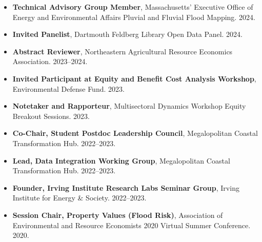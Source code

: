 \documentclass[10pt,oneside]{article}
\begin{document}
\begin{itemize}[label={}]
  \item \textbf{Technical Advisory Group Member}, Massachusetts’ Executive Office of Energy and Environmental Affairs Pluvial and Fluvial Flood Mapping. 2024.
  
  \item \textbf{Invited Panelist}, Dartmouth Feldberg Library Open Data Panel. 2024.
  
  \item \textbf{Abstract Reviewer}, Northeastern Agricultural Resource Economics Association. 2023--2024.
  
  \item \textbf{Invited Participant at Equity and Benefit Cost Analysis Workshop}, Environmental Defense Fund. 2023.
  
  \item \textbf{Notetaker and Rapporteur}, Multisectoral Dynamics Workshop Equity Breakout Sessions. 2023.
  
  \item \textbf{Co-Chair, Student Postdoc Leadership Council}, Megalopolitan Coastal Transformation Hub. 2022--2023.
  
  \item \textbf{Lead, Data Integration Working Group}, Megalopolitan Coastal Transformation Hub. 2022--2023.
  
  \item \textbf{Founder, Irving Institute Research Labs Seminar Group}, Irving Institute for Energy \& Society. 2022--2023.
  
  \item \textbf{Session Chair, Property Values (Flood Risk)}, Association of Environmental and Resource Economists 2020 Virtual Summer Conference. 2020.
  
\end{itemize}
\end{document}
